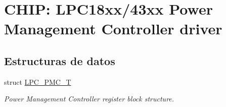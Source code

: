 \hypertarget{group___p_m_c__18_x_x__43_x_x}{}\section{C\+H\+IP\+: L\+P\+C18xx/43xx Power Management Controller driver}
\label{group___p_m_c__18_x_x__43_x_x}
\subsection*{Estructuras de datos}
\begin{DoxyCompactItemize}
\item 
struct \hyperlink{struct_l_p_c___p_m_c___t}{L\+P\+C\+\_\+\+P\+M\+C\+\_\+T}
\begin{DoxyCompactList}\small\item\em Power Management Controller register block structure. \end{DoxyCompactList}\end{DoxyCompactItemize}
